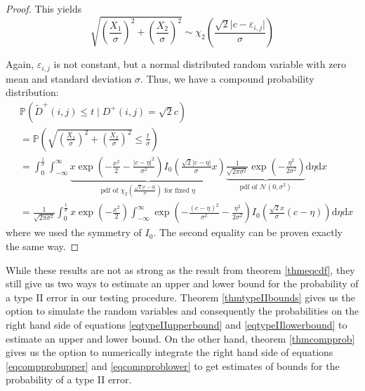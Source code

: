 \documentclass[a4paper,12pt]{article}
\newcommand{\abs}[1]{\lvert#1\rvert}
\theoremstyle{plain}
\theoremstyle{definition}
\theoremstyle{remark}
\begin{document}
\begin{proof}
	This yields
	\begin{equation*}
		\sqrt{\left( \frac{X_1}{\sigma} \right)^2 + \left( \frac{X_2}{\sigma} \right)^2} \sim \chi_2 \left( \frac{\sqrt{2} \abs{c - \varepsilon_{i, j}}}{\sigma} \right)
	\end{equation*}
	
	Again, $\varepsilon_{i, j}$ is not constant, but a normal distributed random variable with zero mean and standard deviation $\sigma$. Thus, we have a compound probability distribution:
	\begin{align*}
		&\mathbb{P}(\tilde{D}^+(i, j) \leq t \mid D^+(i, j) = \sqrt{2} c) \\
		&= \mathbb{P}\left( \sqrt{\left( \frac{X_1}{\sigma} \right)^2 + \left( \frac{X_2}{\sigma} \right)^2} \leq \frac{t}{\sigma} \right) \\
		&= \int_0^\frac{t}{\sigma} \int_{-\infty}^\infty \underbrace{x \exp \left( - \frac{x^2}{2} - \frac{\abs{c - \eta}^2}{\sigma^2} \right) I_0 \left( \frac{\sqrt{2} \abs{c - \eta}}{\sigma} x \right)}_{\textrm{pdf of } \chi_2 \left( \frac{\sqrt{2} \abs{c - \eta}}{\sigma} \right) \textrm{ for fixed } \eta} \underbrace{\frac{1}{\sqrt{2 \pi \sigma^2}} \exp \left( - \frac{\eta^2}{2 \sigma^2} \right)}_{\textrm{pdf of } \mathcal{N}(0, \sigma^2)} \mathrm{d}\eta \mathrm{d}x \\
		&= \frac{1}{\sqrt{2 \pi \sigma^2}} \int_0^\frac{t}{\sigma} x \exp \left( - \frac{x^2}{2} \right) \int_{-\infty}^\infty \exp \left( - \frac{(c - \eta)^2}{\sigma^2} - \frac{\eta^2}{2 \sigma^2} \right) I_0 \left( \frac{\sqrt{2} x}{\sigma} (c - \eta) \right) \mathrm{d}\eta \mathrm{d}x
	\end{align*}
	where we used the symmetry of $I_0$. The second equality can be proven exactly the same way.
\end{proof}

While these results are not as strong as the result from theorem \ref{thmeqcdf}, they still give us two ways to estimate an upper and lower bound for the probability of a type II error in our testing procedure. Theorem \ref{thmtypeIIbounds} gives us the option to simulate the random variables and consequently the probabilities on the right hand side of equations \eqref{eqtypeIIupperbound} and \eqref{eqtypeIIlowerbound} to estimate an upper and lower bound. On the other hand, theorem \ref{thmcompprob} gives us the option to numerically integrate the right hand side of equations \eqref{eqcompprobupper} and \eqref{eqcompproblower} to get estimates of bounds for the probability of a type II error.
\end{document}
